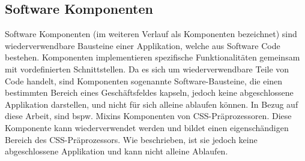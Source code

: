 \subsection{Software Komponenten}
Software Komponenten (im weiteren Verlauf als Komponenten bezeichnet) sind wiederverwendbare Bausteine einer Applikation, welche aus Software Code bestehen. Komponenten implementieren spezifische Funktionalitäten gemeinsam mit vordefinierten Schnittstellen. Da es sich um wiederverwendbare Teile von Code handelt, sind Komponenten sogenannte Software-Bausteine, die einen bestimmten Bereich eines Geschäftsfeldes kapseln, jedoch keine abgeschlossene Applikation darstellen, und nicht für sich alleine ablaufen können. \autocite[1]{Andresen.2003}\newline
In Bezug auf diese Arbeit, sind bspw. Mixins Komponenten von CSS-Präprozessoren. Diese Komponente kann wiederverwendet werden und bildet einen eigenschändigen Bereich des CSS-Präprozessors. Wie beschrieben, ist sie jedoch keine abgeschlossene Applikation und kann nicht alleine Ablaufen.

